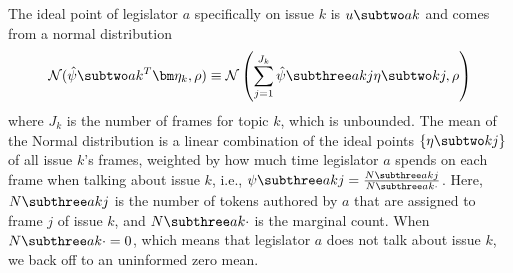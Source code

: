 The ideal point of legislator $a$ specifically on issue $k$ is $u \subtwo ak$
and comes from a normal distribution
\begin{equation}
 \mathcal{N}(\hat{\psi} \subtwo ak^T \bm \eta_k, \rho) \equiv \mathcal{N}\left(\sum_{j=1}^{J_k} \hat{\psi} \subthree akj \eta \subtwo kj, \rho\right)
  \label{eqn:c6_idealpoint}
\end{equation}
where $J_k$ is the number of frames for topic $k$, which is unbounded. The mean
of the Normal distribution is a linear combination of the ideal points $\{\eta
\subtwo kj\}$ of all issue $k$'s frames, weighted by how much time legislator
$a$ spends on each frame when talking about issue $k$, i.e., $\psi \subthree akj
= \frac{N \subthree akj}{N \subthree ak{\cdot}}$. Here, $N \subthree akj$ is the
number of tokens authored by $a$ that are assigned to frame $j$ of issue $k$,
and $N \subthree ak{\cdot}$ is the marginal count. When $N \subthree ak{\cdot} =
0$, which means that legislator $a$ does not talk about issue $k$, we back off
to an uninformed zero mean.


